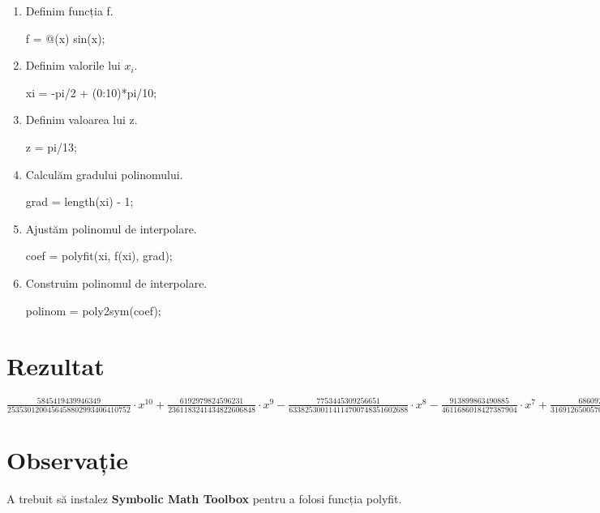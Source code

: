 \documentclass{article}
\begin{document}
\begin{center}
\begin{enumerate}
\item Definim funcția f.\\
 \begin{center}
    f = @(x) sin(x);
    \end{center}
\item  Definim valorile lui $x_i$. \\
\begin{center}
    xi = -pi/2 + (0:10)*pi/10;
\end{center}
\item Definim valoarea lui z. \\
 \begin{center}
    z = pi/13;
 \end{center}
\item Calculăm gradului polinomului. \\
 \begin{center}
    grad = length(xi) - 1;
 \end{center}
 \item Ajustăm polinomul de interpolare. \\
 \begin{center}
    coef = polyfit(xi, f(xi), grad);
 \end{center}
  \item Construim polinomul de interpolare. \\
 \begin{center}
    polinom = poly2sym(coef);
 \end{center}
\end{enumerate}
\end{center}

\section*{Rezultat}
$\frac{5845419439946349}{2535301200456458802993406410752} \cdot x^{10} + \frac{6192979824596231}{2361183241434822606848} \cdot x^9 - \frac{7753445309256651}{633825300114114700748351602688} \cdot x^8 - \frac{913899863490885}{4611686018427387904} \cdot x^7 + \frac{6860929148312471}{316912650057057350374175801344} \cdot x^6 + \frac{4803736910141451}{576460752303423488} \cdot x^5 - \frac{4742251131395917}{316912650057057350374175801344} \cdot x^4 - \frac{6004797759129527}{36028797018963968} \cdot x^3 + \frac{2255690891732239}{633825300114114700748351602688} \cdot x^2 + \frac{9007199225352387}{9007199254740992} \cdot x - \frac{3517712254454825}{20282409603651670423947251286016} = 0$



\section*{Observație}
A trebuit să instalez \textbf{Symbolic Math Toolbox} pentru a folosi funcția polyfit.
\end{document}
